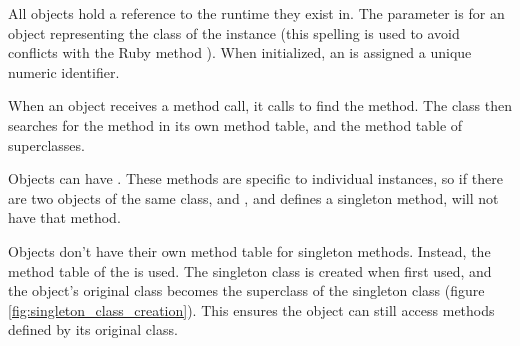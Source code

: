 
All  objects hold a reference to the runtime they exist in. The  parameter is for an object representing the class of the instance (this spelling is used to avoid conflicts with the Ruby method ). When initialized, an  is assigned a unique numeric identifier.

When an object receives a method call, it calls  to find the method. The class then searches for the method in its own method table, and the method table of superclasses.

Objects can have . These methods are specific to individual instances, so if there are two objects of the same class,  and , and  defines a singleton method,  will not have that method.

Objects don't have their own method table for singleton methods. Instead, the method table of the  is used. The singleton class is created when first used, and the object's original class becomes the superclass of the singleton class (figure \ref{fig:singleton_class_creation}). This ensures the object can still access methods defined by its original class.

